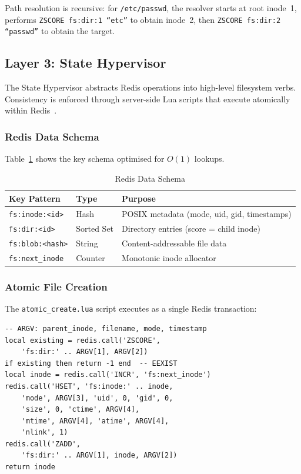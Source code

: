 \documentclass[conference]{IEEEtran}
\begin{document}
Path resolution is recursive: for \texttt{/etc/passwd}, the resolver starts at root inode~1, performs \texttt{ZSCORE fs:dir:1 ``etc''} to obtain inode~2, then \texttt{ZSCORE fs:dir:2 ``passwd''} to obtain the target.

\subsection{Layer 3: State Hypervisor}

The State Hypervisor abstracts Redis operations into high-level filesystem verbs.
Consistency is enforced through server-side Lua scripts that execute atomically within Redis~\cite{redis2023lua}.

\subsubsection{Redis Data Schema}

Table~\ref{tab:redis-schema} shows the key schema optimised for $O(1)$ lookups.

\begin{table}[htbp]
\caption{Redis Data Schema}
\label{tab:redis-schema}
\centering
\footnotesize
\begin{tabular}{@{}llp{3.2cm}@{}}
\toprule
\textbf{Key Pattern} & \textbf{Type} & \textbf{Purpose} \\
\midrule
\texttt{fs:inode:\textless id\textgreater}  & Hash       & POSIX metadata (mode, uid, gid, timestamps) \\
\texttt{fs:dir:\textless id\textgreater}    & Sorted Set & Directory entries (score = child inode) \\
\texttt{fs:blob:\textless hash\textgreater} & String     & Content-addressable file data \\
\texttt{fs:next\_inode}        & Counter    & Monotonic inode allocator \\
\bottomrule
\end{tabular}
\end{table}

\subsubsection{Atomic File Creation}

The \texttt{atomic\_create.lua} script executes as a single Redis transaction:

\begin{lstlisting}[language={[5.3]Lua},caption={Atomic file creation (simplified).},label={lst:lua}]
-- ARGV: parent_inode, filename, mode, timestamp
local existing = redis.call('ZSCORE',
    'fs:dir:' .. ARGV[1], ARGV[2])
if existing then return -1 end  -- EEXIST
local inode = redis.call('INCR', 'fs:next_inode')
redis.call('HSET', 'fs:inode:' .. inode,
    'mode', ARGV[3], 'uid', 0, 'gid', 0,
    'size', 0, 'ctime', ARGV[4],
    'mtime', ARGV[4], 'atime', ARGV[4],
    'nlink', 1)
redis.call('ZADD',
    'fs:dir:' .. ARGV[1], inode, ARGV[2])
return inode
\end{lstlisting}
\end{document}
